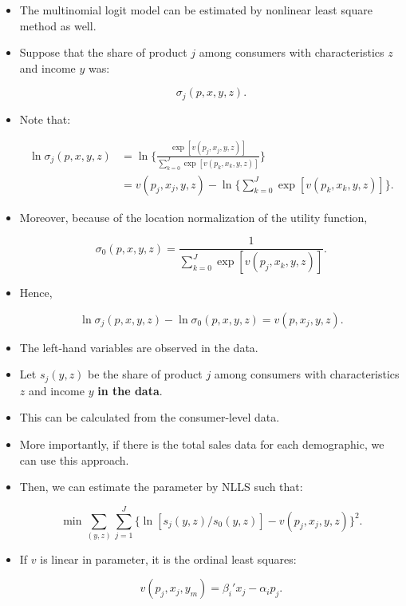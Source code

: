 \documentclass[]{book}
\providecommand{\tightlist}{%
  \setlength{\itemsep}{0pt}\setlength{\parskip}{0pt}}
\begin{document}
\begin{itemize}
\tightlist
\item
  The multinomial logit model can be estimated by nonlinear least square
  method as well.
\item
  Suppose that the share of product \(j\) among consumers with
  characteristics \(z\) and income \(y\) was:

  \begin{equation}
  \sigma_j(p, x, y, z).
  \end{equation}
\item
  Note that:

  \begin{equation}
  \begin{split}
  \ln \sigma_{j}(p, x, y, z)  &= \ln \Bigg\{ \frac{\exp[v(p_j, x_j, y, z) ]}{\sum_{k = 0}^J \exp[v(p_k, x_k, y, z)] }  \Bigg\}\\
  &= v(p_j, x_j, y, z) - \ln\Bigg\{ \sum_{k = 0}^J \exp[v(p_k, x_k, y, z)]  \Bigg\}.
  \end{split}
  \end{equation}
\item
  Moreover, because of the location normalization of the utility
  function,

  \begin{equation}
  \sigma_{0}(p, x, y, z) = \frac{1}{\sum_{k = 0}^J \exp[v(p_j, x_k, y, z)] }.
  \end{equation}
\item
  Hence,

  \begin{equation}
  \ln \sigma_{j}(p, x, y, z) - \ln \sigma_{0}(p, x, y, z) = v(p, x_j, y, z).
  \end{equation}
\item
  The left-hand variables are observed in the data.
\item
  Let \(s_j(y, z)\) be the share of product \(j\) among consumers with
  characteristics \(z\) and income \(y\) \textbf{in the data}.
\item
  This can be calculated from the consumer-level data.
\item
  More importantly, if there is the total sales data for each
  demographic, we can use this approach.
\item
  Then, we can estimate the parameter by NLLS such that:

  \begin{equation}
  \min \sum_{(y, z)} \sum_{j = 1}^J \{\ln[s_{j}(y, z)/s_{0}(y, z)] - v(p_j, x_j, y, z)\}^2.
  \end{equation}
\item
  If \(v\) is linear in parameter, it is the ordinal least squares:

  \begin{equation}
  v(p_j, x_j, y_m) = \beta_i' x_j - \alpha_i p_j.
  \end{equation}
\end{itemize}
\end{document}

